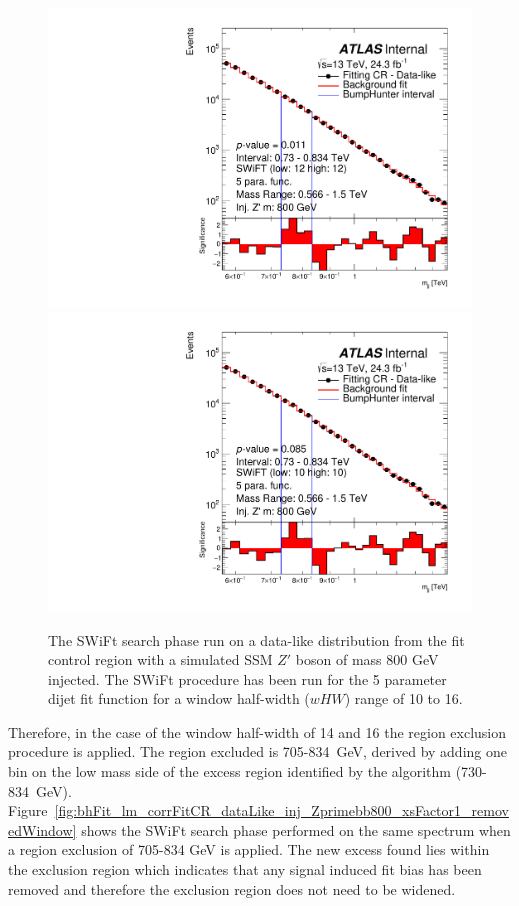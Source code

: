 \begin{figure}[!htb]
{  \includegraphics[width=0.45\linewidth, angle=0]{figs/Dibjet/LowMass/FitStudy_min566/bhFit_corrFitCR_dataLike_5para_low12_high12_inj_Zprimebb800_xsFactor1.pdf}
}
 {
  \includegraphics[width=0.45\linewidth, angle=0]{figs/Dibjet/LowMass/FitStudy_min566/bhFit_corrFitCR_dataLike_5para_low10_high10_inj_Zprimebb800_xsFactor1.pdf}
}

\caption[The SWiFt search phase run on a data-like distribution
          from the fit control region with a simulated SSM $Z'$ boson of mass 800 GeV injected.]
        {\label{fig:bhFit_lm_corrFitCR_dataLike_inj_Zprimebb800_xsFactor1}
          The SWiFt search phase run on a data-like distribution
          from the fit control region with a simulated SSM $Z'$ boson of mass 800 GeV injected.
          The SWiFt procedure has been run for the 5 parameter dijet fit function for a window half-width ($wHW$) range of 10 to 16.
}
\end{figure}

Therefore, in the case of the window half-width of 14 and 16 the region exclusion procedure is applied.
The region excluded is 705-834~GeV, derived by adding one bin on the low mass side of the excess region identified by the \bh{} algorithm (730-834~GeV).
Figure~\ref{fig:bhFit_lm_corrFitCR_dataLike_inj_Zprimebb800_xsFactor1_removedWindow} shows the SWiFt search phase
performed on the same spectrum when a region exclusion of 705-834 GeV is applied.
The new excess found lies within the exclusion region which indicates that any signal induced fit bias has been removed
and therefore the exclusion region does not need to be widened.

